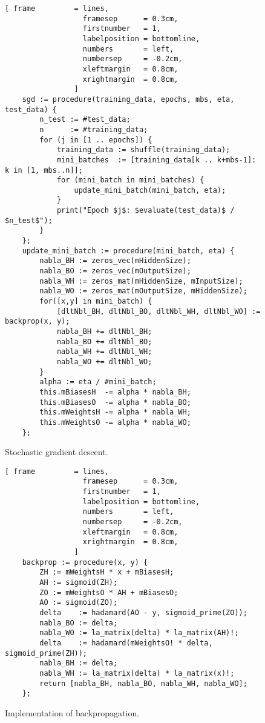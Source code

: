 \begin{figure}[!ht]
\centering
\begin{Verbatim}[ frame         = lines, 
                  framesep      = 0.3cm, 
                  firstnumber   = 1,
                  labelposition = bottomline,
                  numbers       = left,
                  numbersep     = -0.2cm,
                  xleftmargin   = 0.8cm,
                  xrightmargin  = 0.8cm,
                ]
    sgd := procedure(training_data, epochs, mbs, eta, test_data) {
        n_test := #test_data;         
        n      := #training_data;
        for (j in [1 .. epochs]) {
            training_data := shuffle(training_data);
            mini_batches  := [training_data[k .. k+mbs-1]: k in [1, mbs..n]];
            for (mini_batch in mini_batches) {
                update_mini_batch(mini_batch, eta);
            } 
            print("Epoch $j$: $evaluate(test_data)$ / $n_test$");
        }
    };
    update_mini_batch := procedure(mini_batch, eta) {
        nabla_BH := zeros_vec(mHiddenSize);
        nabla_BO := zeros_vec(mOutputSize);
        nabla_WH := zeros_mat(mHiddenSize, mInputSize);
        nabla_WO := zeros_mat(mOutputSize, mHiddenSize);
        for([x,y] in mini_batch) {
            [dltNbl_BH, dltNbl_BO, dltNbl_WH, dltNbl_WO] := backprop(x, y);
            nabla_BH += dltNbl_BH;
            nabla_BO += dltNbl_BO;
            nabla_WH += dltNbl_WH;
            nabla_WO += dltNbl_WO;
        }        
        alpha := eta / #mini_batch;
        this.mBiasesH  -= alpha * nabla_BH;
        this.mBiasesO  -= alpha * nabla_BO;
        this.mWeightsH -= alpha * nabla_WH;
        this.mWeightsO -= alpha * nabla_WO;
    };
\end{Verbatim}
\vspace*{-0.3cm}
\caption{Stochastic gradient descent.}
\label{fig:nn.stlx:sgd}
\end{figure}

\begin{figure}[!ht]
\centering
\begin{Verbatim}[ frame         = lines, 
                  framesep      = 0.3cm, 
                  firstnumber   = 1,
                  labelposition = bottomline,
                  numbers       = left,
                  numbersep     = -0.2cm,
                  xleftmargin   = 0.8cm,
                  xrightmargin  = 0.8cm,
                ]
    backprop := procedure(x, y) {
        ZH := mWeightsH * x + mBiasesH;
        AH := sigmoid(ZH);
        ZO := mWeightsO * AH + mBiasesO;
        AO := sigmoid(ZO);
        delta    := hadamard(AO - y, sigmoid_prime(ZO));
        nabla_BO := delta;
        nabla_WO := la_matrix(delta) * la_matrix(AH)!;
        delta    := hadamard(mWeightsO! * delta, sigmoid_prime(ZH));
        nabla_BH := delta;
        nabla_WH := la_matrix(delta) * la_matrix(x)!;
        return [nabla_BH, nabla_BO, nabla_WH, nabla_WO];
    };
\end{Verbatim}
\vspace*{-0.3cm}
\caption{Implementation of backpropagation.}
\label{fig:nn.stlx}
\end{figure}

